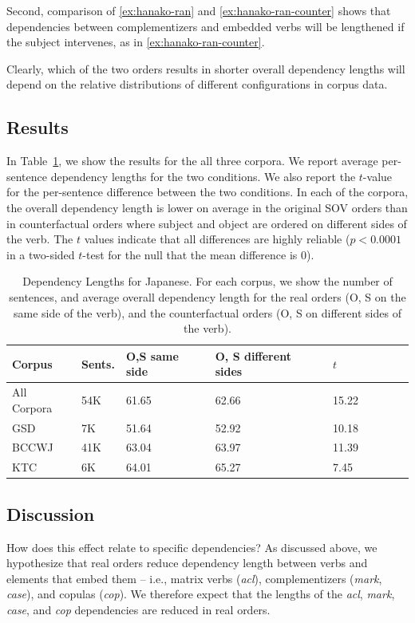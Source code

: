 \documentclass[11pt,a4paper]{article}
\begin{document}
Second, comparison of \ref{ex:hanako-ran} and \ref{ex:hanako-ran-counter} shows that dependencies between complementizers and embedded verbs will be lengthened if the subject intervenes, as in \ref{ex:hanako-ran-counter}.

Clearly, which of the two orders results in shorter overall dependency lengths will depend on the relative distributions of different configurations in corpus data.

\subsection{Results}
In Table~\ref{tab:depl-resu}, we show the results for the all three corpora.
We report average per-sentence dependency lengths for the two conditions.
We also report the $t$-value for the per-sentence difference between the two conditions.
In each of the corpora, the overall dependency length is lower on average in the original SOV orders than in counterfactual orders where subject and object are ordered on different sides of the verb.
The $t$ values indicate that all differences are highly reliable ($p < 0.0001$ in a two-sided $t$-test for the null that the mean difference is $0$).


\begin{table}
\begin{center}
\begin{tabular}{l|l|lllllll}
 Corpus                   &   Sents.                     & O,S same side   & O, S different sides  & $t$   \\ \hline\hline
All Corpora     &  54K     & 61.65 & 62.66 &   15.22   \\ \hline
GSD             &   7K       & 51.64 &  52.92  &  10.18  \\
BCCWJ           &   41K       &    63.04   & 63.97 &  11.39  \\
KTC             &   6K   &  64.01 & 65.27 &  7.45\\ \hline
\end{tabular}
\end{center}
\caption{Dependency Lengths for Japanese. For each corpus, we show the number of sentences, and average overall dependency length for the real orders (O, S on the same side of the verb), and the counterfactual orders (O, S on different sides of the verb).}\label{tab:depl-resu}
\end{table}



\subsection{Discussion}
How does this effect relate to specific dependencies?
As discussed above, we hypothesize that real orders reduce dependency length between verbs and elements that embed them -- i.e., matrix verbs (\emph{acl}), complementizers (\emph{mark}, \emph{case}), and copulas (\emph{cop}).
We therefore expect that the lengths of the \emph{acl}, \emph{mark}, \emph{case}, and \emph{cop} dependencies are reduced in real orders.
\end{document}
